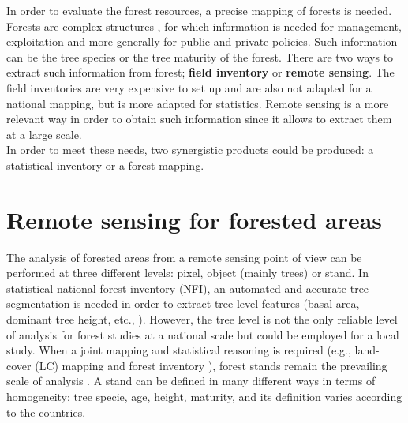 In order to evaluate the forest resources, a precise mapping of forests is needed.
Forests are complex structures \citep{pommerening2002approaches}, for which information is needed for management, exploitation and more generally for public and private policies. Such information can be the tree species or the tree maturity of the forest. There are two ways to extract such information from forest; \textbf{field inventory} or \textbf{remote sensing}. The field inventories are very expensive to set up and are also not adapted for a national mapping, but is more adapted for statistics. Remote sensing is a more relevant way in order to obtain such information since it allows to extract them at a large scale. \\

In order to meet these needs, two synergistic products could be produced: a statistical inventory or a forest mapping.

\section{Remote sensing for forested areas}

The analysis of forested areas from a remote sensing point of view can be performed at three different levels: pixel, object (mainly trees) or stand. In statistical national forest inventory (NFI), an automated and accurate tree segmentation is needed in order to extract tree level features (basal area, dominant tree height, etc., \citep{means2000predicting,Malatamo}). However, the tree level is not the only reliable level of analysis for forest studies at a national scale but could be employed for a local study. When a joint mapping and statistical reasoning is required (e.g., land-cover (LC) mapping and forest inventory \citep{tomppo2008combining}), forest stands remain the prevailing scale of analysis \citep{means2000predicting,White2016CJRS}. A stand can be defined in many different ways in terms of homogeneity: tree specie, age, height, maturity, and its definition varies according to the countries. \\

